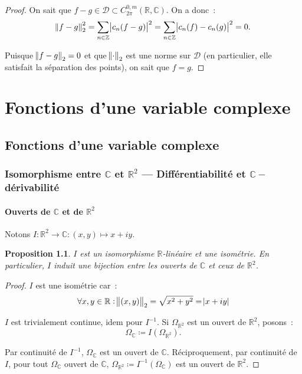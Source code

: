 \documentclass{report}
\newtheorem{prp}[thm]{Proposition}
\theoremstyle{definition}
\theoremstyle{remark}
\numberwithin{equation}{section}
\newcommand{\C}{\mathbb C}
\newcommand{\R}{\mathbb R}
\newcommand{\Z}{\mathbb Z}
\newcommand{\CmT}[2]{C^{#1,m}_{#2}}
\newcommand{\CzmT}[1]{\CmT 0{#1}}
\newcommand{\Czm}{\CzmT{2\pi}}
\begin{document}
			\begin{proof} On sait que $f-g \in \mathcal D \subset \Czm(\R, \C)$. On a donc~:
			\begin{equation}
				\norm {f-g}_2^2 = \sum_{n \in \Z}\abs {c_n(f-g)}^2 = \sum_{n \in \Z}\abs {c_n(f) - c_n(g)}^2 = 0.
			\end{equation}

			Puisque $\norm {f-g}_2 = 0$ et que $\norm \cdot_2$ est une norme sur $\mathcal D$ (en particulier, elle satisfait la séparation des points), on sait que
			$f = g$.
			\end{proof}

\part{Fonctions d'une variable complexe}
\chapter{Fonctions d'une variable complexe}
	\section{Isomorphisme entre $\C$  et $\R^2$ --- Différentiabilité et $\C-$dérivabilité}
		\subsection{Ouverts de $\C$ et de $\R^2$}
			Notons $I : \R^2 \to \C : (x, y) \mapsto x + iy$.

			\begin{prp} $I$ est un isomorphisme $\R$-linéaire et une isométrie. En particulier, $I$ induit une bijection entre les ouverts de $\C$ et ceux de $\R^2$.
			\end{prp}

			\begin{proof} $I$ est une isométrie car~:
			\begin{equation}
				\forall x, y \in \R : \norm {(x, y)}_2 = \sqrt {x^2 + y^2} = \abs {x+iy}
			\end{equation}

			$I$ est trivialement continue, idem pour $I^{-1}$. Si $\Omega_{\R^2}$ est un ouvert de $\R^2$, posons~:
			\begin{equation}
				\Omega_\C \coloneqq I(\Omega_{\R^2}).
			\end{equation}

			Par continuité de $I^{-1}$, $\Omega_\C$ est un ouvert de $\C$. Réciproquement, par continuité de $I$, pour tout $\Omega_\C$ ouvert de $\C$,
			$\Omega_{\R^2} \coloneqq I^{-1}(\Omega_\C)$ est un ouvert de $\R^2$.
			\end{proof}
\end{document}
